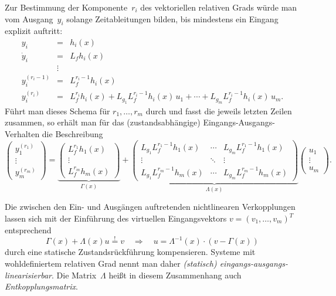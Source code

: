 Zur Bestimmung der Komponente~$r_{i}$ des vektoriellen relativen
Grads würde man vom Ausgang~$y_{i}$ solange Zeitableitungen bilden,
bis mindestens ein Eingang explizit auftritt:
\[
\begin{array}{lcl}
y_{i} & = & h_{i}(x)\\
\dot{y}_{i} & = & L_{f}h_{i}(x)\\
 & \vdots\\
y_{i}^{(r_{i}-1)} & = & L_{f}^{r_{i}-1}h_{i}(x)\\
y_{i}^{(r_{i})} & = & L_{f}^{r_{i}}h_{i}(x)+L_{g_{1}}L_{f}^{r_{i}-1}h_{i}(x)\,u_{1}+\cdots+L_{g_{m}}L_{f}^{r_{i}-1}h_{i}(x)\,u_{m}.
\end{array}
\]
Führt man dieses Schema für $r_{1},\ldots,r_{m}$ durch und fasst
die jeweils letzten Zeilen zusammen, so erhält man für das (zustandsabhängige)
Eingangs-Ausgangs-Verhalten die Beschreibung
\begin{equation}
\left(\begin{array}{c}
y_{1}^{(r_{1})}\\
\vdots\\
y_{m}^{(r_{m})}
\end{array}\right)\!=\!\underbrace{\left(\begin{array}{c}
L_{f}^{r_{1}}h_{1}(x)\\
\vdots\\
L_{f}^{r_{m}}h_{m}(x)
\end{array}\right)}_{{\displaystyle \Gamma(x)}}\!+\!\underbrace{\left(\begin{array}{ccc}
L_{g_{1}}L_{f}^{r_{1}-1}h_{1}(x) & \cdots & L_{g_{m}}L_{f}^{r_{1}-1}h_{1}(x)\\
\vdots & \ddots & \vdots\\
L_{g_{1}}L_{f}^{r_{m}-1}h_{m}(x) & \cdots & L_{g_{m}}L_{f}^{r_{m}-1}h_{m}(x)
\end{array}\right)}_{{\displaystyle \Lambda(x)}}\!\!\left(\begin{array}{c}
u_{1}\\
\vdots\\
u_{m}
\end{array}\right).\label{eq:MIMO-E-A-Beschreibung}
\end{equation}

Die zwischen den Ein- und Ausgängen auftretenden nichtlinearen Verkopplungen
lassen sich mit der Einführung des virtuellen Eingangsvektors $v=(v_{1},\ldots,v_{m})^{T}$
entsprechend
\begin{equation}
\Gamma(x)+\Lambda(x)u\stackrel{!}{=}v\quad\Longrightarrow\quad u=\Lambda^{-1}(x)\cdot\left(v-\Gamma(x)\right)\label{eq:entkopplung-mimo}
\end{equation}
durch eine statische Zustandsrückführung
kompensieren. Systeme mit wohldefiniertem relativen Grad nennt man
daher \emph{(statisch) eingangs-ausgangs-linearisierbar}.
Die Matrix~$\Lambda$ heißt in diesem Zusammenhang auch \emph{Entkopplungsmatrix}. 

